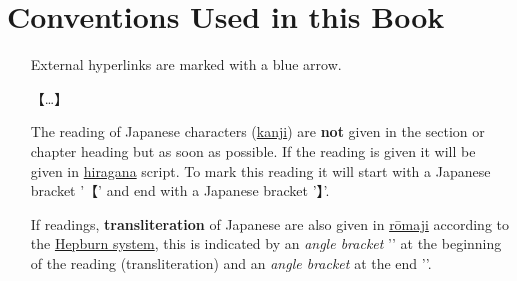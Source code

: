 \section*{Conventions Used in this Book}\label{sec:ConventionsUsesInThisBook}


\begin{itemize}

    \item[\Link]

        External hyperlinks are marked with a blue arrow.


    \item[{【}\ldots{】}]

        The reading of Japanese characters (\hyperref[sec:Kanji]{kanji}) are
        \textbf{not} given in the section or chapter heading but as soon as
        possible. If the reading is given it will be given in
        \hyperref[sec:Hiragana]{hiragana} script. To mark this reading it will
        start with a Japanese bracket '{【}' and end with a Japanese bracket
        '{】}'.


        \medskip

    \item[\jtl{\ldots}]

         If readings, \textbf{transliteration} of Japanese are also given in
         \hyperref[sec:Romaji]{rōmaji} according to the
         \hyperref[sec:Hepburn]{Hepburn system}, this is indicated by an
         \textit{angle bracket} '\textlangle{}' at the beginning of the reading
         (transliteration) and an \textit{angle bracket} at the end
         '\textrangle{}'.


\end{itemize}
